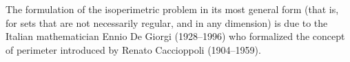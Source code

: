 The formulation of the isoperimetric problem in its most general form 
(that is, for sets that are not necessarily regular, and in any dimension)
is due to the Italian mathematician Ennio De Giorgi (1928--1996)
%
who formalized the concept of perimeter introduced
by Renato Caccioppoli (1904--1959).%
%
%